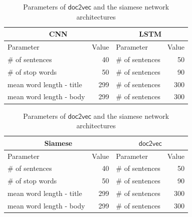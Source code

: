 \documentclass{sigkddExp}
\begin{document}
\begin{table}[h]
\parbox{.55\linewidth}{
    
    \begin{tabular}{l|r|l|r}
          \multicolumn{2}{c|}{CNN}
         & \multicolumn{2}{c}{LSTM}
         \\
         \toprule
         Parameter
         & Value
         & Parameter
         & Value
         \\
         \# of sentences
         & 40
         & \# of sentences
         & 50
         \\
         \# of stop words 
         & 50
         & \# of sentences
         & 90
         \\
         mean word length - title
         & 299
         & \# of sentences
         & 300
         \\
         mean word length - body
         & 299
         & \# of sentences
         & 300
    \end{tabular}
    \caption{Parameters of the encoder and domain differentiator\protect\\ networks for domain adaptation}
    \label{tab:indomain}
}
\parbox{.5\linewidth}{
    
    \begin{tabular}{l|r|l|r}
          \multicolumn{2}{c|}{Siamese}
         & \multicolumn{2}{c}{$\mathsf{doc2vec}$}
         \\
         \toprule
         Parameter
         & Value
         & Parameter
         & Value
         \\
         \# of sentences
         & 40
         & \# of sentences
         & 50
         \\
         \# of stop words 
         & 50
         & \# of sentences
         & 90
         \\
         mean word length - title
         & 299
         & \# of sentences
         & 300
         \\
         mean word length - body
         & 299
         & \# of sentences
         & 300
    \end{tabular}
    \caption{Parameters of $\mathsf{doc2vec}$ and the siamese network architectures}
    \label{tab:indomain}
}
\end{table}
\end{document}
